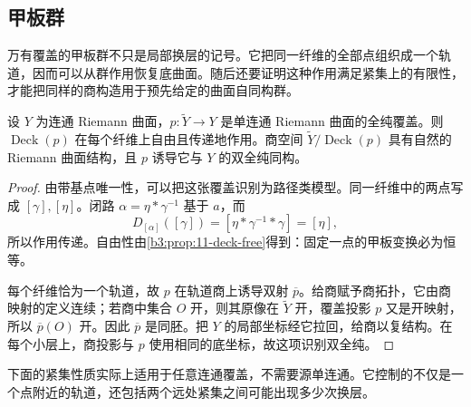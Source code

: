\subsection{甲板群}
\label{b3:subsec:110303}

万有覆盖的甲板群不只是局部换层的记号。它把同一纤维的全部点组织成一个轨道，因而可以从群作用恢复底曲面。随后还要证明这种作用满足紧集上的有限性，才能把同样的商构造用于预先给定的曲面自同构群。

\begin{proposition}\label{b3:prop:11-universal-deck}
设 \(Y\) 为连通 Riemann 曲面，\(p:\widetilde Y\rightarrow Y\) 是单连通 Riemann 曲面的全纯覆盖。则 \(\operatorname{Deck}(p)\) 在每个纤维上自由且传递地作用。商空间 \(\widetilde Y/\operatorname{Deck}(p)\) 具有自然的 Riemann 曲面结构，且 \(p\) 诱导它与 \(Y\) 的双全纯同构。
\end{proposition}
\begin{proof}
由带基点唯一性，可以把这张覆盖识别为路径类模型。同一纤维中的两点写成 \([\gamma],[\eta]\)。闭路 \(\alpha=\eta*\gamma^{-1}\) 基于 \(a\)，而
\[
 D_{[\alpha]}([\gamma])
 =[\eta*\gamma^{-1}*\gamma]=[\eta],
\]
所以作用传递。自由性由\cref{b3:prop:11-deck-free}得到：固定一点的甲板变换必为恒等。

每个纤维恰为一个轨道，故 \(p\) 在轨道商上诱导双射 \(\overline p\)。给商赋予商拓扑，它由商映射的定义连续；若商中集合 \(O\) 开，则其原像在 \(\widetilde Y\) 开，覆盖投影 \(p\) 又是开映射，所以 \(\overline p(O)\) 开。因此 \(\overline p\) 是同胚。把 \(Y\) 的局部坐标经它拉回，给商以复结构。在每个小层上，商投影与 \(p\) 使用相同的底坐标，故这项识别双全纯。
\end{proof}

下面的紧集性质实际上适用于任意连通覆盖，不需要源单连通。它控制的不仅是一个点附近的轨道，还包括两个远处紧集之间可能出现多少次换层。

